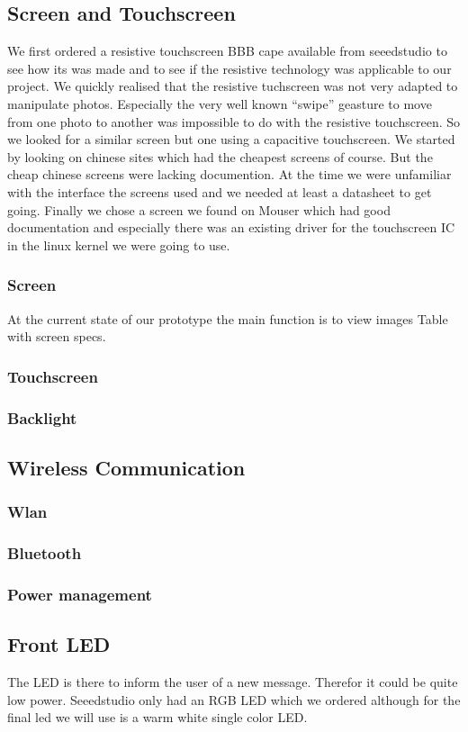\subsection{Screen and Touchscreen}
We first ordered a resistive touchscreen BBB cape available from seeedstudio to see how its was made and to see if the resistive technology was applicable to our project. We quickly realised that the resistive tuchscreen was not very adapted to manipulate photos. Especially the very well known “swipe” geasture to move from one photo to another was impossible to do with the resistive touchscreen.
So we looked for a similar screen but one using a capacitive touchscreen. We started by looking on chinese sites which had the cheapest screens of course. But the cheap chinese screens were lacking documention. At the time we were unfamiliar with the interface the screens used and we needed at least a datasheet to get going.
 Finally we chose a screen we found on Mouser which had good documentation and especially there was an existing driver for the touchscreen IC in the linux kernel we were going to use.
\subsubsection{Screen}
At the current state of our prototype the main function is to view images 
Table with screen specs.
\subsubsection{Touchscreen}
\subsubsection{Backlight}
\subsection{Wireless Communication}
\subsubsection{Wlan}
\subsubsection{Bluetooth}
\subsubsection{Power management}
\subsection{Front LED}
The LED is there to inform the user of a new message. Therefor it could be quite low power. Seeedstudio only had an RGB LED which we ordered although for the final led we will use is a warm white single color LED. 

